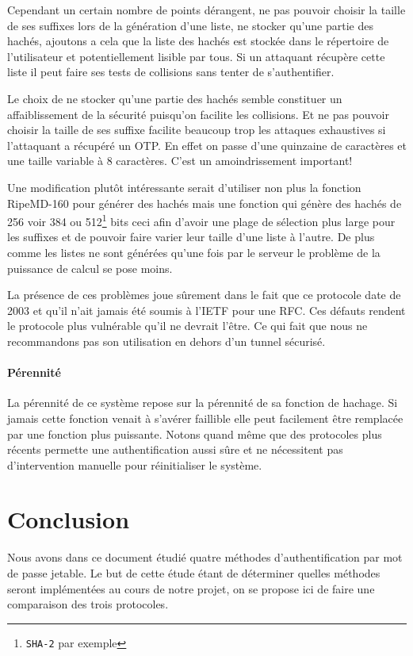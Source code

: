 \documentclass{../res/univ-projet}
\begin{document}
        Cependant un certain nombre de points dérangent, ne pas pouvoir choisir
    la taille de ses suffixes lors de la génération d'une liste, ne stocker qu'une partie des hachés, ajoutons a 
    cela que la liste des hachés est stockée dans le répertoire de l'utilisateur et potentiellement lisible par tous.
    Si un attaquant récupère cette liste il peut faire ses tests de collisions sans tenter de s'authentifier.

        Le choix de ne stocker qu'une partie des hachés semble constituer un affaiblissement de la sécurité puisqu'on facilite
    les collisions. Et ne pas pouvoir choisir la taille de ses suffixe facilite beaucoup trop les attaques exhaustives
    si l'attaquant a récupéré un OTP. En effet on passe d'une quinzaine de caractères et une taille variable à 8 caractères.
    C'est un amoindrissement important!

        Une modification plutôt intéressante serait d'utiliser non plus la fonction RipeMD-160 pour générer des hachés mais
    une fonction qui génère des hachés de 256 voir 384 ou 512\footnote{\verb?SHA-2? par exemple} bits ceci afin d'avoir une
    plage de sélection plus large pour les suffixes et de pouvoir faire varier leur taille d'une liste à l'autre.
    De plus comme les listes ne sont générées qu'une fois par le serveur le problème de la puissance de calcul se pose moins.

        La présence de ces \og problèmes \fg{} joue sûrement dans le fait que ce protocole date de 2003 et qu'il n'ait jamais
    été soumis à l'IETF pour une RFC. Ces défauts rendent le protocole plus vulnérable qu'il ne devrait l'être. Ce qui fait
    que nous ne recommandons pas son utilisation en dehors d'un tunnel sécurisé.

\subsection{Pérennité}
    La pérennité de ce système repose sur la pérennité de sa fonction de hachage. Si jamais cette
    fonction venait à s'avérer faillible elle peut facilement être remplacée par une fonction plus
    puissante.
        Notons quand même que des protocoles plus récents permette une authentification aussi sûre
    et ne nécessitent pas d'intervention manuelle pour réinitialiser le système.

\part{Conclusion}
\setcounter{section}{0}
Nous avons dans ce document étudié quatre méthodes d'authentification par mot de passe jetable. Le but de cette étude 
étant de déterminer quelles méthodes seront implémentées au cours de notre projet, on se propose ici de faire une 
comparaison des trois protocoles.
\end{document}
